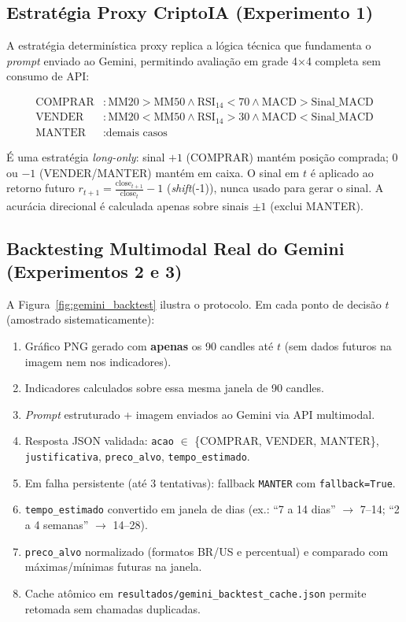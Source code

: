 \documentclass[conference]{IEEEtran}
\begin{document}
\subsection{Estratégia Proxy CriptoIA (Experimento 1)}

A estratégia determinística proxy replica a lógica técnica que fundamenta o \textit{prompt} enviado ao Gemini, permitindo avaliação em grade 4×4 completa sem consumo de API:

\begin{align}
\text{COMPRAR} &: \text{MM20} > \text{MM50} \land \text{RSI}_{14} < 70 \land \text{MACD} > \text{Sinal\_MACD} \\
\text{VENDER}  &: \text{MM20} < \text{MM50} \land \text{RSI}_{14} > 30 \land \text{MACD} < \text{Sinal\_MACD} \\
\text{MANTER}   &: \text{demais casos}
\end{align}

É uma estratégia \textit{long-only}: sinal $+1$ (COMPRAR) mantém posição comprada; $0$ ou $-1$ (VENDER/MANTER) mantém em caixa. O sinal em $t$ é aplicado ao retorno futuro $r_{t+1} = \frac{\text{close}_{t+1}}{\text{close}_t} - 1$ (\textit{shift}(-1)), nunca usado para gerar o sinal. A acurácia direcional é calculada apenas sobre sinais $\pm 1$ (exclui MANTER).

\subsection{Backtesting Multimodal Real do Gemini (Experimentos 2 e 3)}

A Figura~\ref{fig:gemini_backtest} ilustra o protocolo. Em cada ponto de decisão $t$ (amostrado sistematicamente):

\begin{enumerate}
  \item Gráfico PNG gerado com \textbf{apenas} os 90 candles até $t$ (sem dados futuros na imagem nem nos indicadores).
  \item Indicadores calculados sobre essa mesma janela de 90 candles.
  \item \textit{Prompt} estruturado + imagem enviados ao Gemini via API multimodal.
  \item Resposta JSON validada: \texttt{acao} $\in$ \{COMPRAR, VENDER, MANTER\}, \texttt{justificativa}, \texttt{preco\_alvo}, \texttt{tempo\_estimado}.
  \item Em falha persistente (até 3 tentativas): fallback \texttt{MANTER} com \texttt{fallback=True}.
  \item \texttt{tempo\_estimado} convertido em janela de dias (ex.: ``7 a 14 dias'' $\rightarrow$ 7–14; ``2 a 4 semanas'' $\rightarrow$ 14–28).
  \item \texttt{preco\_alvo} normalizado (formatos BR/US e percentual) e comparado com máximas/mínimas futuras na janela.
  \item Cache atômico em \texttt{resultados/gemini\_backtest\_cache.json} permite retomada sem chamadas duplicadas.
\end{enumerate}
\end{document}
